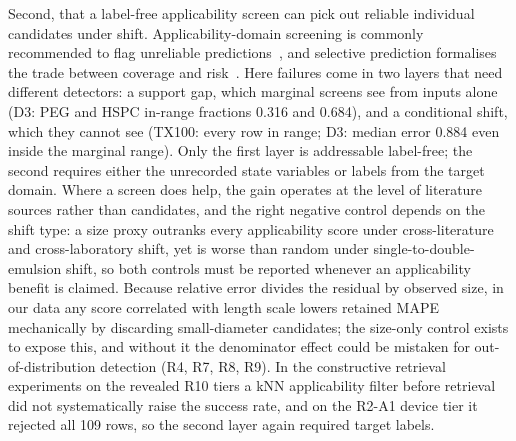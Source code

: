 \documentclass[11pt,a4paper]{article}
\newcommand{\tox}{TX100}
\begin{document}
Second, that a label-free applicability screen can pick out reliable
individual candidates under shift. Applicability-domain screening is commonly
recommended to flag unreliable predictions~\cite{tropsha2003,netzeva2005,sahigara2012},
and selective prediction formalises the trade between coverage and
risk~\cite{elyaniv2010}. Here failures come in two layers that need different
detectors: a support gap, which marginal screens see from inputs alone (D3:
PEG and HSPC in-range fractions 0.316 and 0.684), and a conditional shift,
which they cannot see (\tox{}: every row in range; D3: median error 0.884
even inside the marginal range). Only the first layer is addressable
label-free; the second requires either the unrecorded state variables or
labels from the target domain. Where a screen does help, the gain operates at
the level of literature sources rather than candidates, and the right
negative control depends on the shift type: a size proxy outranks every
applicability score under cross-literature and cross-laboratory shift, yet is
worse than random under single-to-double-emulsion shift, so both controls must be reported
whenever an applicability benefit is claimed. Because relative error divides
the residual by observed size, in our data any score correlated with length
scale lowers retained MAPE mechanically by discarding small-diameter
candidates; the size-only control exists to expose this, and without it the
denominator effect could be mistaken for out-of-distribution detection (R4,
R7, R8, R9). In the constructive retrieval experiments on the revealed R10
tiers a kNN applicability filter before retrieval did not systematically
raise the success rate, and on the R2-A1 device tier it rejected all 109
rows, so the second layer again required target labels.
\end{document}
